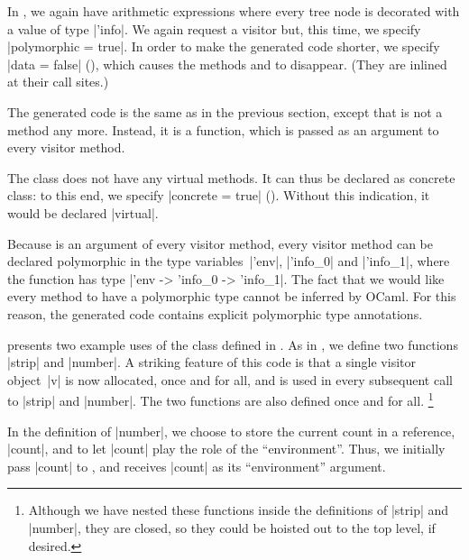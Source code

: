 \documentclass[11pt,a4paper,twoside]{article}
\begin{document}
In , we again have arithmetic expressions
where every tree node is decorated with a value of type \oc|'info|. We again
request a \map visitor but, this time, we specify \oc|polymorphic = true|.
%
In order to make the generated code shorter, we specify \oc|data = false|
(), which causes the methods  and
 to disappear. (They are inlined at their call sites.)

The generated code is the same as in the previous section,
except that  is not a method any more. Instead, it is
a function, which is passed as an argument to every visitor method.

The class \map does not have any virtual methods. It can thus be declared as
concrete class: to this end, we specify
%
\oc|concrete = true| (). Without this indication, it would be
declared \oc|virtual|.

Because  is an argument of every visitor method,
every visitor method can be declared polymorphic in the type variables~\oc|'env|,
\oc|'info_0| and \oc|'info_1|,
where the function  has type \oc|'env -> 'info_0 -> 'info_1|.
%
The fact that we would like every method to have a polymorphic type cannot
be inferred by OCaml. For this reason, the generated code contains explicit
polymorphic type annotations.

 presents two example uses of the class
\map defined in . As in
, we define two functions \oc|strip| and \oc|number|.
A striking feature of this code is that a single visitor object~\oc|v| is now
allocated, once and for all, and is used in every subsequent call to \oc|strip|
and \oc|number|. The two  functions are also defined once
and for all.%
%
\footnote{Although we have nested these functions inside the definitions of
  \oc|strip| and \oc|number|, they are closed, so they could be hoisted out to
  the top level, if desired.}

In the definition of \oc|number|, we choose to store the current count in a
reference, \oc|count|, and to let \oc|count| play the role of the
``environment''. Thus, we initially pass \oc|count| to ,
and  receives \oc|count| as its ``environment'' argument.
\end{document}
